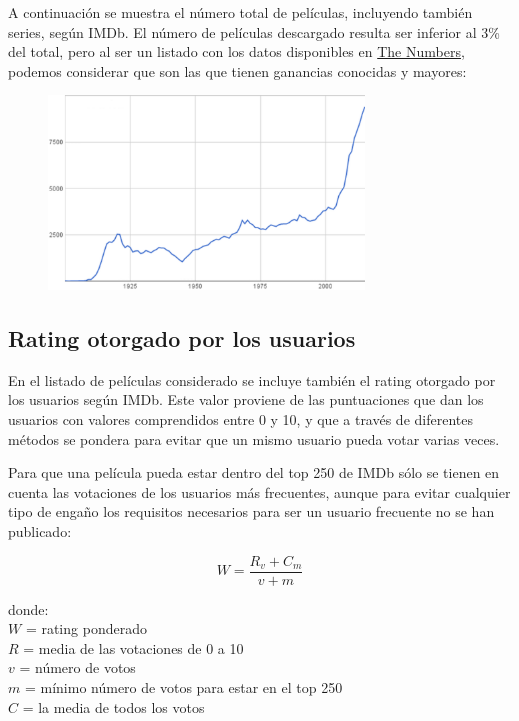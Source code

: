 \documentclass{article}
\begin{document}
A continuación se muestra el número total de películas, incluyendo también series, según IMDb\cite{quora}. El número de películas descargado resulta ser inferior al 3\% del total, pero al ser un listado con los datos disponibles en \href{http://www.the-numbers.com/movie/budgets/all}{The Numbers}, podemos considerar que son las que tienen ganancias conocidas y mayores:

\begin{figure}[h]
\centering
\includegraphics[width=3.3in,clip,keepaspectratio]{./images/total_movies_imdb}
\end{figure}

\subsection{Rating otorgado por los usuarios}

En el listado de películas considerado se incluye también el rating otorgado por los usuarios según IMDb. Este valor proviene de las puntuaciones que dan los usuarios con valores comprendidos entre 0 y 10, y que a través de diferentes métodos se pondera para evitar que un mismo usuario pueda votar varias veces.

Para que una película pueda estar dentro del top 250 de IMDb sólo se tienen en cuenta las votaciones de los usuarios más frecuentes, aunque para evitar cualquier tipo de engaño los requisitos necesarios para ser un usuario frecuente no se han publicado:

\begin{equation}
W=\frac{R_{v}+C_{m}}{v+m}
\end{equation}

\noindent
donde:\\

\indent
$W$ = rating ponderado\\
\indent
$R$ = media de las votaciones de 0 a 10\\
\indent
$v$ = número de votos\\
\indent
$m$ = mínimo número de votos para estar en el top 250\\
\indent
$C$ = la media de todos los votos\\
\end{document}
